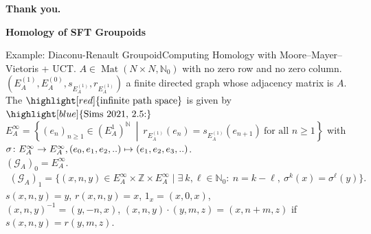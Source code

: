 \documentclass[aspectratio=169]{beamer}
\renewcommand{\ldots}{
  \mathinner{{\ldotp}{\ldotp}}
}
\begin{document}
\begin{frame}[plain,c]
  \begin{center}
    \Huge \textbf{Thank you.}
  \end{center}
\end{frame}

\appendix

\begin{frame}[plain,c]
  \begin{center}
    \Huge \textbf{Homology of SFT Groupoids}
  \end{center}
\end{frame}

\begin{frame}{Example: Diaconu-Renault Groupoid}{Computing Homology with Moore--Mayer--Vietoris + UCT.}
  \(A\in \operatorname{Mat}(N\times N, \mathbb N_0)\) with no zero row and no zero column.\\
  \((E^{(1)}_A,E^{(0)}_A,s_{E^{(1)}_A},r_{E^{(1)}_A})\) a finite directed graph whose adjacency matrix is \(A\).\\[0.2cm]
  The $\highlight[red]{\text{infinite path space}}$ is given by $\highlight[blue]{\text{Sims 2021, 2.5:}}$\\
  \(E_A^\infty
  = \left\{(e_n)_{n\ge 1}\in (E_A^1)^{\mathbb N}\ \middle|\ r_{E^{(1)}_A}(e_n)=s_{E^{(1)}_A}(e_{n+1})\ \text{for all } n\ge 1 \right\}
  \)
  with \\
  \(\sigma\colon E_A^{\infty}\to E_A^{\infty}, (e_0,e_1,e_2,\ldots)\mapsto (e_1,e_2,e_3,\ldots)\).\\
  \((\mathcal G_A)_0=E_A^\infty\). \\
  \(
    \begin{aligned}
      (\mathcal G_A)_1 = \{(x,n,y)\in E_A^\infty\times\mathbb Z\times E_A^\infty \mid \exists\ k, \ell\in\mathbb N_0:\ n=k-\ell, \ \sigma^k(x)=\sigma^\ell(y)\}.
    \end{aligned}
  \)
  \(s(x,n,y)=y\), \(r(x,n,y)=x\), \(1_x=(x,0,x)\),\\
  \((x,n,y)^{-1}=(y,-n,x)\), \((x,n,y) \cdot (y,m,z)=(x,n+m,z)\) if \(s(x,n,y)=r(y,m,z)\).
\end{frame}
\end{document}
